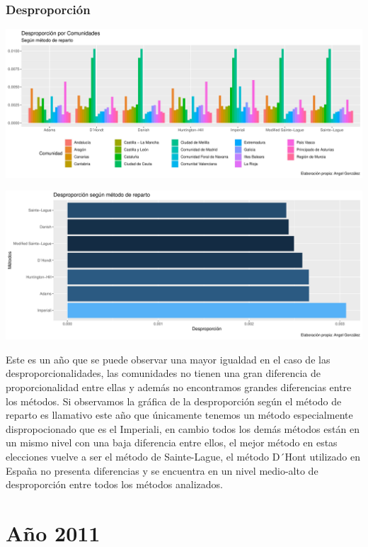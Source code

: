 \documentclass[12pt,a4paper,]{book}
\numberwithin{dummy}{section}
\theoremstyle{ocrenumbox}
\theoremstyle{blacknumex}
\theoremstyle{blacknumbox}
\theoremstyle{ocrenum}
\theoremstyle{ocrenum}
\begin{document}
\hypertarget{desproporciuxf3n-9}{%
\subsubsection{Desproporción}\label{desproporciuxf3n-9}}

\begin{center}\includegraphics[width=0.95\linewidth]{figurasR/unnamed-chunk-93-1} \end{center}

\begin{center}\includegraphics[width=0.95\linewidth]{figurasR/unnamed-chunk-93-2} \end{center}

Este es un año que se puede observar una mayor igualdad en el caso de
las desproporcionalidades, las comunidades no tienen una gran diferencia
de proporcionalidad entre ellas y además no encontramos grandes
diferencias entre los métodos. Si observamos la gráfica de la
desproporción según el método de reparto es llamativo este año que
únicamente tenemos un método especialmente dispropocionado que es el
Imperiali, en cambio todos los demás métodos están en un mismo nivel con
una baja diferencia entre ellos, el mejor método en estas elecciones
vuelve a ser el método de Sainte-Lague, el método D´Hont utilizado en
España no presenta diferencias y se encuentra en un nivel medio-alto de
desproporción entre todos los métodos analizados.

\hypertarget{auxf1o-2011}{%
\section{Año 2011}\label{auxf1o-2011}}
\end{document}
